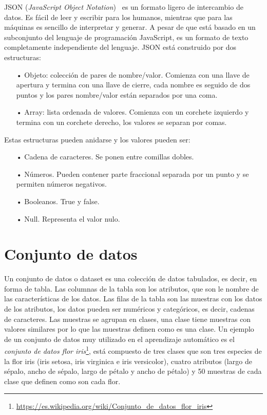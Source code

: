 \documentclass[a4paper, 12pt]{book}
\begin{document}
JSON (\emph{JavaScript Object Notation})~\cite{Pagina_de_JSON} es un formato ligero de intercambio de datos. Es fácil de leer y escribir para los humanos, mientras que para las máquinas es sencillo de interpretar y generar. 
A pesar de que está basado en un subconjunto del lenguaje de programación JavaScript, es un formato de texto completamente independiente del lenguaje. JSON está construido por dos estructuras:

\begin{itemize}
	\item[•] Objeto: colección de pares de nombre/valor. Comienza con una llave de apertura y termina con una llave de cierre, cada nombre es seguido de dos puntos y los pares nombre/valor están separados por una coma.
	\item[•] Array: lista ordenada de valores. Comienza con un corchete izquierdo y termina con un corchete derecho, los valores se separan por comas.
\end{itemize}

Estas estructuras pueden anidarse y los valores pueden ser:
	\begin{itemize}
		\item[•] Cadena de caracteres. Se ponen entre comillas dobles.
		\item[•] Números. Pueden contener parte fraccional separada por un punto y se permiten números negativos.
		\item[•] Booleanos. True y false.
		\item[•] Null. Representa el valor nulo.
	\end{itemize}

\section{Conjunto de datos} 
\label{sec:dataset}

Un conjunto de datos o dataset es una colección de datos tabulados, es decir, en forma de tabla. 
Las columnas de la tabla son los atributos, que son le nombre de las características de los datos. 
Las filas de la tabla son las muestras con los datos de los atributos, los datos pueden ser numéricos y categóricos, es decir, cadenas de caracteres. 
Las muestras se agrupan en clases, una clase tiene muestras con valores similares por lo que las muestras definen como es una clase. 
Un ejemplo de un conjunto de datos muy utilizado en el aprendizaje automático es el \emph{conjunto de datos flor iris}\footnote{\url{https://es.wikipedia.org/wiki/Conjunto_de_datos_flor_iris}}, está compuesto de tres clases que son tres especies de la flor iris (iris setosa, iris virginica e iris versicolor), cuatro atributos (largo de sépalo, ancho de sépalo, largo de pétalo y ancho de pétalo) y 50 muestras de cada clase que definen como son cada flor.
\end{document}

